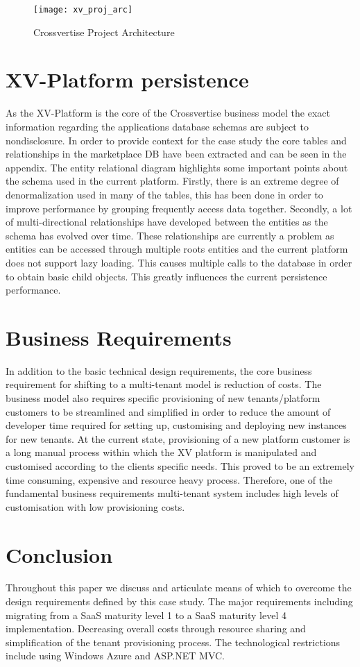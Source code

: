 \begin{figure}
\centering
\texttt{[image: xv\_proj\_arc]}
\caption{Crossvertise Project Architecture}
\label{fig:xv_proj)arc}
\end{figure}

\section{XV-Platform persistence}
As the XV-Platform is the core of the Crossvertise business model the exact information regarding the applications database schemas are subject to nondisclosure. In order to provide context for the case study the core tables and relationships in the marketplace DB have been extracted and can be seen in the appendix. The entity relational diagram highlights some important points about the schema used in the current platform. Firstly, there is an extreme degree of denormalization used in many of the tables, this has been done in order to improve performance by grouping frequently access data together. Secondly, a lot of multi-directional relationships have developed between the entities as the schema has evolved over time. These relationships are currently a problem as entities can be accessed through multiple roots entities and the current platform does not support lazy loading. This causes multiple calls to the database in order to obtain basic child objects. This greatly influences the current persistence performance. 



\section{Business Requirements}
In addition to the basic technical design requirements, the core business requirement for shifting to a multi-tenant model is reduction of costs. The business model also requires specific provisioning of new tenants/platform customers to be streamlined and simplified in order to reduce the amount of developer time required for setting up, customising and deploying new instances for new tenants. At the current state, provisioning of a new platform customer is a long manual process within which the XV platform is manipulated and customised according to the clients specific needs. This proved to be an extremely time consuming, expensive and resource heavy process. Therefore, one of the fundamental business requirements multi-tenant system includes high levels of customisation with low provisioning costs. 

\section{Conclusion}
Throughout this paper we discuss and articulate means of which to overcome the design requirements defined by this case study. The major requirements including migrating from a SaaS maturity level 1 to a SaaS maturity level 4 implementation. Decreasing overall costs through resource sharing and simplification of the tenant provisioning process. The technological restrictions include using Windows Azure and ASP.NET MVC.
